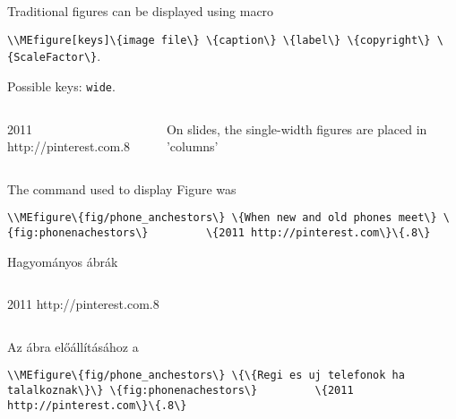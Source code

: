 



{
Traditional figures can be displayed using macro
\par\noindent\lstinline|\\MEfigure[keys]\{image file\} \{caption\} \{label\} \{copyright\} \{ScaleFactor\}|.
\par\noindent Possible keys: \lstinline|wide|.


\begin{columns}
		{2011 http://pinterest.com}{.8}

On slides, the single-width figures are placed in 'columns'
\end{columns}

\par\noindent The command used to display Figure\ao{~\ref{fig:phonenanchestors}} was
\par\noindent\lstinline|\\MEfigure\{fig/phone_anchestors\} \{When new and old phones meet\} \{fig:phonenachestors\}
		\{2011 http://pinterest.com\}\{.8\}|

}
{Hagyományos ábrák}
{
\begin{columns}
		{2011 http://pinterest.com}{.8}
\end{columns}
\par\noindent Az \ao{~\ref{fig:phonenachestors}} ábra előállításához a
\par\noindent\lstinline|\\MEfigure\{fig/phone_anchestors\} \{\{Regi es uj telefonok ha talalkoznak\}\} \{fig:phonenachestors\}
		\{2011 http://pinterest.com\}\{.8\}|
}

